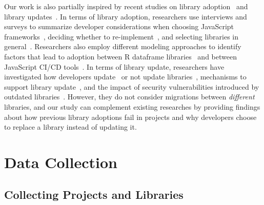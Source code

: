 \documentclass[sigconf, screen]{acmart}
\begin{document}
Our work is also partially inspired by recent studies on library adoption~\cite{pano2018factors, de2018library, de2018empirical, kavaler2019tool, yin2020team, larios2020selecting, ma2020methodology, lamba2020heard, xu2020reinventing} and library updates~\cite{cox2015measuring, kula2015trusting, bavota2015apache, mirhosseini2017can, kula2018developers, zerouali2018empirical, decan2018evolution, cogo2019empirical, soto2019emergence, dietrich2019dependency, zimmermann2019small}. 
In terms of library adoption, researchers use interviews and surveys to summarize developer considerations when choosing JavaScript frameworks~\cite{pano2018factors}, deciding whether to re-implement~\cite{xu2020reinventing}, and selecting libraries in general~\cite{larios2020selecting}.
Researchers also employ different modeling approaches to identify factors that lead to adoption between R dataframe libraries~\cite{ma2020methodology} and between JavaScript CI/CD tools~\cite{kavaler2019tool, yin2020team, lamba2020heard}. %
In terms of library update, researchers have investigated how developers update~\cite{bavota2015apache} or not update libraries~\cite{cox2015measuring, kula2015trusting, kula2018developers, soto2019emergence, zerouali2018empirical, decan2018evolution}, mechanisms to support library update~\cite{mirhosseini2017can, dietrich2019dependency}, and the impact of security vulnerabilities introduced by outdated libraries~\cite{zimmermann2019small, decan2018impact}.
However, they do not consider migrations between \textit{different} libraries, and our study can complement existing researches by providing findings about how previous library adoptions fail in projects and why developers choose to replace a library instead of updating it.

\section{Data Collection}
\label{sec:data}

\subsection{Collecting Projects and Libraries}
\end{document}
